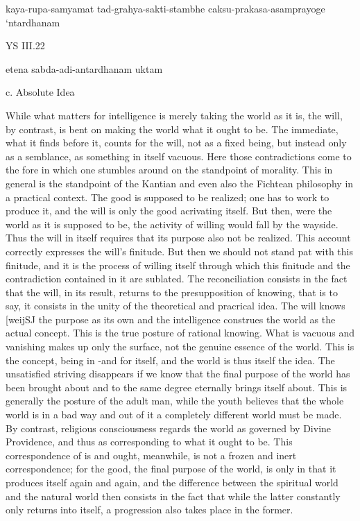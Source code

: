     kaya-rupa-samyamat tad-grahya-sakti-stambhe caksu-prakasa-asamprayoge ‘ntardhanam

    YS III.22

    etena sabda-adi-antardhanam uktam

    c. Absolute Idea

    While what matters for intelligence is merely taking the world as it is,
    the will, by contrast, is bent on making the world what it ought to be.
    The immediate, what it finds before it, counts for the will, not as a fixed being,
    but instead only as a semblance, as something in itself vacuous.
    Here those contradictions come to the fore in which one stumbles around on the standpoint
    of morality. This in general is the standpoint of the Kantian and even also the
    Fichtean philosophy in a practical context. The good is supposed
    to be realized; one has to work to produce it, and the will is only the good
    acrivating itself. But then, were the world as it is supposed to be, the activity
    of willing would fall by the wayside. Thus the will in itself requires that its
    purpose also not be realized. This account correctly expresses the will's finitude.
    But then we should not stand pat with this finitude, and it is the process of
    willing itself through which this finitude and the contradiction contained in it
    are sublated. The reconciliation consists in the fact that the will, in its result,
    returns to the presupposition of knowing, that is to say, it consists in the unity of
    the theoretical and pracrical idea. The will knows [weijSJ the purpose as its own
    and the intelligence construes the world as the actual concept. This is the true
    posture of rational knowing. What is vacuous and vanishing makes up only the
    surface, not the genuine essence of the world. This is the concept, being in -and
    for itself, and the world is thus itself the idea. The unsatisfied striving disappears
    if we know that the final purpose of the world has been brought about and to the
    same degree eternally brings itself about. This is generally the posture of the adult
    man, while the youth believes that the whole world is in a bad way and out of it
    a completely different world must be made. By contrast, religious consciousness
    regards the world as governed by Divine Providence, and thus as corresponding
    to what it ought to be. This correspondence of is and ought, meanwhile, is not
    a frozen and inert correspondence; for the good, the final purpose of the world,
    is only in that it produces itself again and again, and the difference between
    the spiritual world and the natural world then consists in the fact that while
    the latter constantly only returns into itself, a progression also takes place in the
    former.

